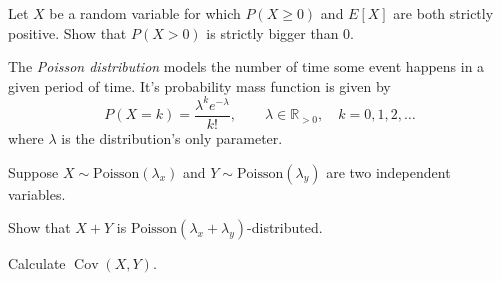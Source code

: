 \documentclass[a4paper,10pt,landscape,twocolumn]{scrartcl}
\DeclareMathOperator{\Cov}{Cov}
\begin{document}
\begin{exercise}[]
Let $X$ be a random variable for which $P(X\ge 0)$ and $E[X]$ are both strictly positive. Show that $P(X>0)$ is strictly bigger than $0$.
\end{exercise}

\begin{exercise}
The \emph{Poisson distribution} 	models the number of time some event happens in a given period of time. It's probability mass function is given by
\[
P(X = k) = {\frac {\lambda ^{k}e^{-\lambda }}{k!}}, \qquad \lambda \in \mathbb{R}_{>0}, \quad k=0,1,2,\dots
\]
where $\lambda$ is the distribution's only parameter.

Suppose $X \sim \text{Poisson}(\lambda_x)$ and $Y \sim \text{Poisson}(\lambda_y)$ are two independent variables. 

	\begin{subex}
	Show that $X+Y$ is $\text{Poisson}(\lambda_x + \lambda_y)$-distributed.
	\end{subex}
	
	\begin{subex}
	Calculate $\Cov(X, Y)$.
	\end{subex}
	


\end{exercise}
\end{document}
